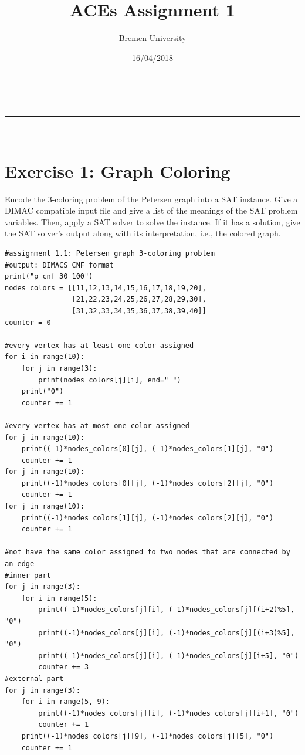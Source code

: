 \documentclass[a4paper,11pt]{article}
\makeatletter
\newcommand{\linia}{\rule{\linewidth}{0.5pt}}
\theoremstyle{mytheor}
\renewcommand{\maketitle}{
\begin{center}
\vspace{2ex}
{\huge \textsc{\@title}}
\vspace{1ex}
\\
\linia\\
\@author \hfill \@date
\vspace{4ex}
\end{center}
}
\makeatother
\begin{document}
\title{ACEs Assignment \textnumero{} 1}

\author{Bremen University}

\date{16/04/2018}

\maketitle

\section*{Exercise 1: Graph Coloring}

Encode the 3-coloring problem of the Petersen graph into a SAT instance. Give a DIMAC compatible input file and give a list of the meanings of the SAT problem variables. Then, apply a SAT solver to solve the instance. If it has a solution, give the SAT solver’s output along with its interpretation, i.e., the colored graph.

\begin{lstlisting}[label={list:first},caption=Python code-DIMAC generator.]
#assignment 1.1: Petersen graph 3-coloring problem
#output: DIMACS CNF format
print("p cnf 30 100")
nodes_colors = [[11,12,13,14,15,16,17,18,19,20],
                [21,22,23,24,25,26,27,28,29,30],
                [31,32,33,34,35,36,37,38,39,40]]
counter = 0

#every vertex has at least one color assigned
for i in range(10):
    for j in range(3):
        print(nodes_colors[j][i], end=" ")
    print("0")
    counter += 1
    
#every vertex has at most one color assigned
for j in range(10):
    print((-1)*nodes_colors[0][j], (-1)*nodes_colors[1][j], "0")
    counter += 1
for j in range(10):
    print((-1)*nodes_colors[0][j], (-1)*nodes_colors[2][j], "0")
    counter += 1
for j in range(10):
    print((-1)*nodes_colors[1][j], (-1)*nodes_colors[2][j], "0")
    counter += 1

#not have the same color assigned to two nodes that are connected by an edge
#inner part
for j in range(3):
    for i in range(5):
        print((-1)*nodes_colors[j][i], (-1)*nodes_colors[j][(i+2)%5], "0")
        print((-1)*nodes_colors[j][i], (-1)*nodes_colors[j][(i+3)%5], "0")
        print((-1)*nodes_colors[j][i], (-1)*nodes_colors[j][i+5], "0")
        counter += 3
#external part
for j in range(3):
    for i in range(5, 9):
        print((-1)*nodes_colors[j][i], (-1)*nodes_colors[j][i+1], "0")
        counter += 1
    print((-1)*nodes_colors[j][9], (-1)*nodes_colors[j][5], "0")
    counter += 1
\end{lstlisting}
\end{document}
